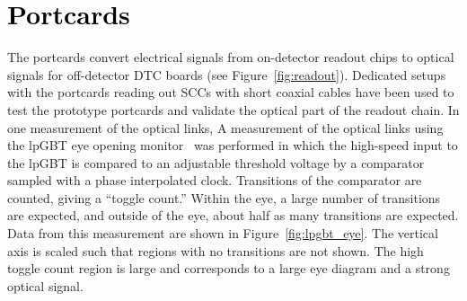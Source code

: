 \documentclass[a4paper,11pt]{article}
\newcommand{\vtrxp}{VTRx+}
\newcommand{\fig}{Figure}
\newcommand{\black}{\textcolor{black}}
\begin{document}
\section{\black{Portcards}}
\label{sec:optical}

The portcards convert electrical signals from on-detector readout chips to optical signals for off-detector DTC boards (see \fig~\ref{fig:readout}).
Dedicated setups with the portcards reading out SCCs with short coaxial cables have been used to test the prototype portcards and validate the optical part of the readout chain.
In one measurement of the optical links,
A measurement of the optical links using the lpGBT eye opening monitor~\cite{ref:lpgbt_1} was performed in which the high-speed input to the lpGBT is compared to an adjustable threshold voltage by a comparator sampled with a phase interpolated clock.
Transitions of the comparator are counted, giving a ``toggle count.''
Within the eye, a large number of transitions are expected, and outside of the eye, about half as many transitions are expected.
Data from this measurement are shown in \fig~\ref{fig:lpgbt_eye}.
The vertical axis is scaled such that regions with no transitions are not shown.
The high toggle count region is large and corresponds to a large eye diagram and a strong optical signal.

%

\end{document}
